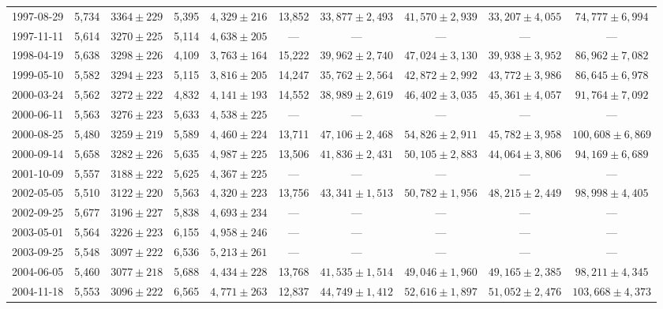 \begin{landscape}
\begin{longtable}{cccccccccc}
{1997-08-29} & 5,734 & {$3364  \pm  229$} & 5,395 & {$4,329 \pm 216$} & 13,852 & {$33,877 \pm 2,493$} & {$41,570 \pm 2,939$} & {$33,207 \pm 4,055$} & {$74,777 \pm 6,994$} \\
{1997-11-11} & 5,614 & {$3270  \pm  225$} & 5,114 & {$4,638 \pm 205$} & --- & --- & --- & --- & --- \\
{1998-04-19} & 5,638 & {$3298  \pm  226$} & 4,109 & {$3,763 \pm 164$} & 15,222 & {$39,962 \pm 2,740$} & {$47,024 \pm 3,130$} & {$39,938 \pm 3,952$} & {$86,962 \pm 7,082$} \\
{1999-05-10} & 5,582 & {$3294  \pm  223$} & 5,115 & {$3,816 \pm 205$} & 14,247 & {$35,762 \pm 2,564$} & {$42,872 \pm 2,992$} & {$43,772 \pm 3,986$} & {$86,645 \pm 6,978$} \\
{2000-03-24} & 5,562 & {$3272  \pm  222$} & 4,832 & {$4,141 \pm 193$} & 14,552 & {$38,989 \pm 2,619$} & {$46,402 \pm 3,035$} & {$45,361 \pm 4,057$} & {$91,764 \pm 7,092$} \\
{2000-06-11} & 5,563 & {$3276  \pm  223$} & 5,633 & {$4,538 \pm 225$} & --- & --- & --- & --- & --- \\
{2000-08-25} & 5,480 & {$3259  \pm  219$} & 5,589 & {$4,460 \pm 224$} & 13,711 & {$47,106 \pm 2,468$} & {$54,826 \pm 2,911$} & {$45,782 \pm 3,958$} & {$100,608 \pm 6,869$} \\
{2000-09-14} & 5,658 & {$3282  \pm  226$} & 5,635 & {$4,987 \pm 225$} & 13,506 & {$41,836 \pm 2,431$} & {$50,105 \pm 2,883$} & {$44,064 \pm 3,806$} & {$94,169 \pm 6,689$} \\
{2001-10-09} & 5,557 & {$3188  \pm  222$} & 5,625 & {$4,367 \pm 225$} & --- & --- & --- & --- & --- \\
{2002-05-05} & 5,510 & {$3122  \pm  220$} & 5,563 & {$4,320 \pm 223$} & 13,756 & {$43,341 \pm 1,513$} & {$50,782 \pm 1,956$} & {$48,215 \pm 2,449$} & {$98,998 \pm 4,405$} \\
{2002-09-25} & 5,677 & {$3196  \pm  227$} & 5,838 & {$4,693 \pm 234$} & --- & --- & --- & --- & --- \\
{2003-05-01} & 5,564 & {$3226  \pm  223$} & 6,155 & {$4,958 \pm 246$} & --- & --- & --- & --- & --- \\
{2003-09-25} & 5,548 & {$3097  \pm  222$} & 6,536 & {$5,213 \pm 261$} & --- & --- & --- & --- & --- \\
{2004-06-05} & 5,460 & {$3077  \pm  218$} & 5,688 & {$4,434 \pm 228$} & 13,768 & {$41,535 \pm 1,514$} & {$49,046 \pm 1,960$} & {$49,165 \pm 2,385$} & {$98,211 \pm 4,345$} \\
{2004-11-18} & 5,553 & {$3096  \pm  222$} & 6,565 & {$4,771 \pm 263$} & 12,837 & {$44,749 \pm 1,412$} & {$52,616 \pm 1,897$} & {$51,052 \pm 2,476$} & {$103,668 \pm 4,373$} \\

\end{longtable}
\end{landscape}
